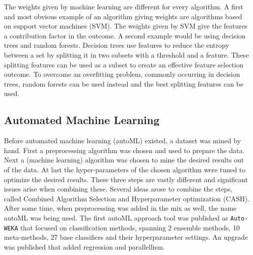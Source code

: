 \documentclass[10pt,a4paper]{report}
\begin{document}
	The weights given by machine learning are different for every algorithm. A first and most obvious example of an algorithm giving weights are algorithms based on support vector machines (SVM). The weights given by SVM give the features a contribution factor in the outcome\cite{jong2004feature, prados2004mining, zhang2006recursive, guyon2002gene}. A second example would be using decision trees and random forests. Decision trees use features to reduce the entropy between a set by splitting it in two subsets with a threshold and a feature. These splitting features can be used as a subset to create an effective feature selection outcome\cite{geurts2005proteomic, wu2003comparison, Duch2006}. To overcome an overfitting problem, commonly occurring in decision trees, random forests can be used instead and the best splitting features can be used\cite{liaw2002classification}.
	
	
	
	
	
	\subsection{Automated Machine Learning}
	\label{FSsubsec:AutomatedMachineLearning}
	
	Before automated machine learning (autoML) existed, a dataset was mined by hand. First a preprocessing algorithm was chosen and used to prepare the data. Next a (machine learning) algorithm was chosen to mine the desired results out of the data. At last the hyper-parameters of the chosen algorithm were tuned to optimize the desired results. These three steps are vastly different and significant issues arise when combining these. Several ideas arose to combine the steps, called Combined Algorithm Selection and Hyperparameter optimization (CASH)\cite{thornton2013auto}. After some time, when preprocessing was added in the mix as well, the name autoML was being used\cite{Gijsbers2017Thesis}. The first autoML approach tool was published as \texttt{Auto-WEKA} that focused on classification methods, spanning 2 ensemble methods, 10 meta-methods, 27 base classifiers and their hyperparameter settings\cite{thornton2013auto}. An upgrade was published that added regression and parallellism\cite{kotthoff2016auto}.   
	
\end{document}
